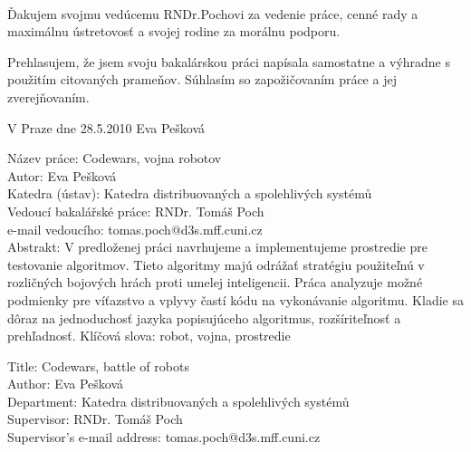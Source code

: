 \documentclass[12pt,notitlepage]{report}
\begin{document}
\normalsize %
\setcounter{page}{2} %

\ \vspace{10mm} 

\noindent Ďakujem svojmu vedúcemu RNDr.Pochovi za vedenie práce, cenné rady a maximálnu ústretovosť a svojej rodine za morálnu podporu. 

\vspace{\fill} %
\noindent Prehlasujem, že jsem svoju bakalárskou práci napísala samostatne a výhradne s použitím citovaných prameňov. Súhlasím so zapožičovaním práce a jej zverejňovaním.

\bigskip
\noindent V Praze dne 28.5.2010 \hspace{\fill}Eva Pešková\\ %


\tableofcontents

\newpage %

\noindent
Název práce: Codewars, vojna robotov\\
Autor: Eva Pešková\\
Katedra (ústav): Katedra distribuovaných a spolehlivých systémů\\
Vedoucí bakalářské práce: RNDr. Tomáš Poch\\
e-mail vedoucího: tomas.poch@d3s.mff.cuni.cz \\

\noindent Abstrakt: V predloženej práci navrhujeme a implementujeme prostredie pre testovanie algoritmov. Tieto algoritmy majú odrážať stratégiu použiteľnú  v rozličných bojových hrách proti umelej inteligencii. Práca analyzuje možné podmienky pre víťazstvo a vplyvy častí kódu na vykonávanie algoritmu. Kladie sa dôraz na jednoduchosť jazyka popisujúceho algoritmus, rozšíriteľnosť a prehľadnosť.
\noindent Klíčová slova: robot, vojna, prostredie

\vspace{10mm}

\noindent
Title: Codewars, battle of robots\\
Author: Eva Pešková\\
Department: Katedra distribuovaných a spolehlivých systémů\\
Supervisor: RNDr. Tomáš Poch\\
Supervisor's e-mail address: tomas.poch@d3s.mff.cuni.cz \\
\end{document}
